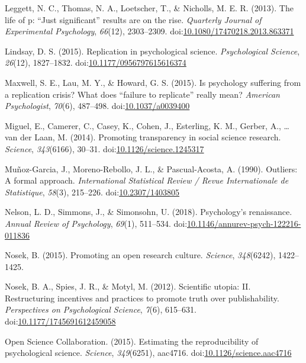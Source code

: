 \documentclass[english,man]{apa6}
\theoremstyle{definition}
\theoremstyle{definition}
\theoremstyle{definition}
\theoremstyle{remark}
\begin{document}
\hypertarget{ref-Leggett}{}
Leggett, N. C., Thomas, N. A., Loetscher, T., \& Nicholls, M. E. R.
(2013). The life of p: ``Just significant'' results are on the rise.
\emph{Quarterly Journal of Experimental Psychology}, \emph{66}(12),
2303--2309.
doi:\href{https://doi.org/10.1080/17470218.2013.863371}{10.1080/17470218.2013.863371}

\hypertarget{ref-Lindsay2015}{}
Lindsay, D. S. (2015). Replication in psychological science.
\emph{Psychological Science}, \emph{26}(12), 1827--1832.
doi:\href{https://doi.org/10.1177/0956797615616374}{10.1177/0956797615616374}

\hypertarget{ref-Maxwell2015}{}
Maxwell, S. E., Lau, M. Y., \& Howard, G. S. (2015). Is psychology
suffering from a replication crisis? What does ``failure to replicate''
really mean? \emph{American Psychologist}, \emph{70}(6), 487--498.
doi:\href{https://doi.org/10.1037/a0039400}{10.1037/a0039400}

\hypertarget{ref-Miguel2014}{}
Miguel, E., Camerer, C., Casey, K., Cohen, J., Esterling, K. M., Gerber,
A., \ldots{} van der Laan, M. (2014). Promoting transparency in social
science research. \emph{Science}, \emph{343}(6166), 30--31.
doi:\href{https://doi.org/10.1126/science.1245317}{10.1126/science.1245317}

\hypertarget{ref-Munoz-Garcia1990}{}
Muñoz-Garcia, J., Moreno-Rebollo, J. L., \& Pascual-Acosta, A. (1990).
Outliers: A formal approach. \emph{International Statistical Review /
Revue Internationale de Statistique}, \emph{58}(3), 215--226.
doi:\href{https://doi.org/10.2307/1403805}{10.2307/1403805}

\hypertarget{ref-Nelson2018}{}
Nelson, L. D., Simmons, J., \& Simonsohn, U. (2018). Psychology's
renaissance. \emph{Annual Review of Psychology}, \emph{69}(1), 511--534.
doi:\href{https://doi.org/10.1146/annurev-psych-122216-011836}{10.1146/annurev-psych-122216-011836}

\hypertarget{ref-Nosek2015b}{}
Nosek, B. (2015). Promoting an open research culture. \emph{Science},
\emph{348}(6242), 1422--1425.

\hypertarget{ref-Nosek2012c}{}
Nosek, B. A., Spies, J. R., \& Motyl, M. (2012). Scientific utopia: II.
Restructuring incentives and practices to promote truth over
publishability. \emph{Perspectives on Psychological Science},
\emph{7}(6), 615--631.
doi:\href{https://doi.org/10.1177/1745691612459058}{10.1177/1745691612459058}

\hypertarget{ref-ScienceCollaboration2015}{}
Open Science Collaboration. (2015). Estimating the reproducibility of
psychological science. \emph{Science}, \emph{349}(6251), aac4716.
doi:\href{https://doi.org/10.1126/science.aac4716}{10.1126/science.aac4716}
\end{document}
